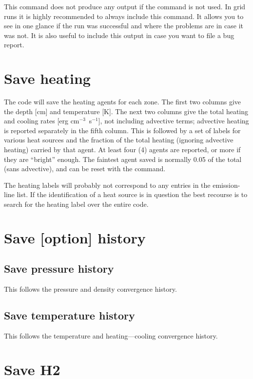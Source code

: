 This command does not produce any output if the  command
is not used. In grid runs it is highly recommended to always include this command.
It allows you to see in one glance if the run was successful and where the problems
are in case it was not. It is also useful to include this output in case you want
to file a bug report.

\section{Save heating}

The code will save the heating agents for each zone.  The first two columns
give the depth [cm] and temperature [K].  The next two columns give the
total heating and cooling rates [erg cm$^{-3}$~s$^{-1}$], not including
advective terms; advective heating is reported separately in the fifth column.
This is followed by a set of labels for various heat sources and the fraction
of the total heating (ignoring advective heating) carried by that agent.
At least four (4) agents are reported, or more if they are ``bright'' enough.
The faintest agent saved is normally 0.05 of the total (sans advective), and
can be reset with the  command.

The heating labels will probably not correspond to any entries in the
emission-line list.  If the identification of a heat source is in question
the best recourse is to search for the heating label over the entire code.

\section{Save [option] history}

\subsection{Save pressure history}

This follows the pressure and density convergence history.

\subsection{Save temperature history}

This follows the temperature and heating---cooling convergence history.

\section{Save H2}

